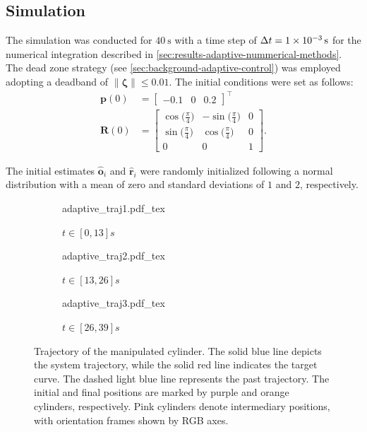 \subsection{Simulation}
The simulation was conducted for $\qty{40}{\second}$ with a time step of $\Delta t=\qty{1E-3}{\second}$ for the numerical integration described in \cref{sec:results-adaptive-nummerical-methods}. The dead zone strategy (see \cref{sec:background-adaptive-control}) was employed adopting a deadband of $\|\boldsymbol{\zeta}\| \le 0.01$. The initial conditions were set as follows:
\begin{align}
    \mathbf{p}(0) &= \begin{bmatrix}
        -0.1 & 0 & 0.2
    \end{bmatrix}^\top\\
    \mathbf{R}(0) &= \begin{bmatrix}
        \cos\bigl(\frac{\pi}{4}\bigr) & -\sin\bigl(\frac{\pi}{4}\bigr) & 0\\
        \sin\bigl(\frac{\pi}{4}\bigr) & \cos\bigl(\frac{\pi}{4}\bigr) & 0\\
        0 & 0 & 1
    \end{bmatrix}.
\end{align}

The initial estimates $\widehat{\mathbf{o}}_i$ and $\widehat{\mathbf{r}}_i$ were randomly initialized following a normal distribution with a mean of zero and standard deviations of $1$ and $2$, respectively. 
\begin{figure}[ht]
    \centering
    \begin{subfigure}[b]{0.32\textwidth}
        \centering
        \def\svgwidth{\linewidth}
        {{adaptive_traj1.pdf_tex}}
        \caption{$t\in[0, 13]s$}
        \label{fig:adaptive-traj-first}
    \end{subfigure}
    \hfill
    \begin{subfigure}[b]{0.32\textwidth}
        \centering
        \def\svgwidth{\linewidth}
        {{adaptive_traj2.pdf_tex}}
        \caption{$t\in[13, 26]s$}
        \label{fig:adaptive-traj-second}
    \end{subfigure}
    \hfill
    \begin{subfigure}[b]{0.32\textwidth}
        \centering
        \def\svgwidth{\linewidth}
        {{adaptive_traj3.pdf_tex}}
        \caption{$t\in[26, 39]s$}
        \label{fig:adaptive-traj-third}
    \end{subfigure}
    \caption{Trajectory of the manipulated cylinder. The solid blue line depicts the system trajectory, while the solid red line indicates the target curve. The dashed light blue line represents the past trajectory. The initial and final positions are marked by purple and orange cylinders, respectively. Pink cylinders denote intermediary positions, with orientation frames shown by RGB axes.}
    \label{fig:adaptive-trajectory}
\end{figure}

